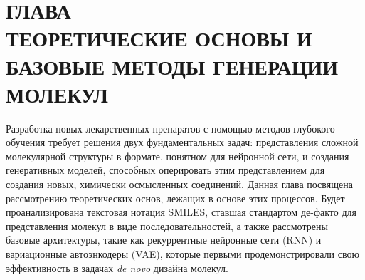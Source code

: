 \documentclass[../main.tex]{subfiles}
\begin{document}
\onlyinsubfile{
    \renewcommand{\contentsname}{ОГЛАВЛЕНИЕ}
    \setcounter{tocdepth}{3}
    \tableofcontents
}

\chapter*{\MakeUppercase{Глава \\ Теоретические основы и базовые методы генерации молекул}}\label{chapter:base}

Разработка новых лекарственных препаратов с помощью методов глубокого обучения требует решения двух фундаментальных задач: представления сложной молекулярной структуры в формате, понятном для нейронной сети, и создания генеративных моделей, способных оперировать этим представлением для создания новых, химически осмысленных соединений. Данная глава посвящена рассмотрению теоретических основ, лежащих в основе этих процессов. Будет проанализирована текстовая нотация SMILES, ставшая стандартом де-факто для представления молекул в виде последовательностей, а также рассмотрены базовые архитектуры, такие как рекуррентные нейронные сети (RNN) и вариационные автоэнкодеры (VAE), которые первыми продемонстрировали свою эффективность в задачах \textit{de novo} дизайна молекул.





\onlyinsubfile{
    \printbibliography[heading=bibintoc, title={Библиографический список}]
}
\end{document}
